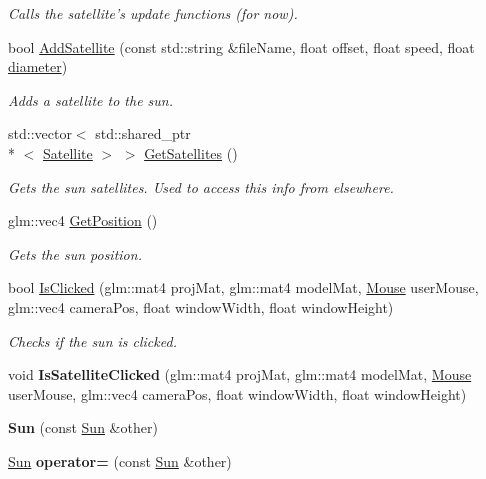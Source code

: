 \begin{DoxyCompactItemize}
\begin{DoxyCompactList}\small\item\em Calls the satellite's update functions (for now). \end{DoxyCompactList}\item 
bool \hyperlink{class_sun_aa83727a648f0456be4164fd6f2dc1e75}{Add\-Satellite} (const std\-::string \&file\-Name, float offset, float speed, float \hyperlink{class_sun_ac35fc9ebc427d9c8c9fd3ee3a12fce82}{diameter})
\begin{DoxyCompactList}\small\item\em Adds a satellite to the sun. \end{DoxyCompactList}\item 
\hypertarget{class_sun_a69fc54810b99f61d33be2dafafa3273d}{std\-::vector$<$ std\-::shared\-\_\-ptr\\*
$<$ \hyperlink{class_satellite}{Satellite} $>$ $>$ \hyperlink{class_sun_a69fc54810b99f61d33be2dafafa3273d}{Get\-Satellites} ()}\label{class_sun_a69fc54810b99f61d33be2dafafa3273d}

\begin{DoxyCompactList}\small\item\em Gets the sun satellites. Used to access this info from elsewhere. \end{DoxyCompactList}\item 
\hypertarget{class_sun_a8b531f7cf5b4b39ab1f5f453894f52bd}{glm\-::vec4 \hyperlink{class_sun_a8b531f7cf5b4b39ab1f5f453894f52bd}{Get\-Position} ()}\label{class_sun_a8b531f7cf5b4b39ab1f5f453894f52bd}

\begin{DoxyCompactList}\small\item\em Gets the sun position. \end{DoxyCompactList}\item 
bool \hyperlink{class_sun_a07ac47d10ff08b43c74de2b704d0ba5a}{Is\-Clicked} (glm\-::mat4 proj\-Mat, glm\-::mat4 model\-Mat, \hyperlink{class_mouse}{Mouse} user\-Mouse, glm\-::vec4 camera\-Pos, float window\-Width, float window\-Height)
\begin{DoxyCompactList}\small\item\em Checks if the sun is clicked. \end{DoxyCompactList}\item 
\hypertarget{class_sun_a5808caa1b90e6a743df2df5ecb9f9850}{void {\bfseries Is\-Satellite\-Clicked} (glm\-::mat4 proj\-Mat, glm\-::mat4 model\-Mat, \hyperlink{class_mouse}{Mouse} user\-Mouse, glm\-::vec4 camera\-Pos, float window\-Width, float window\-Height)}\label{class_sun_a5808caa1b90e6a743df2df5ecb9f9850}

\item 
\hypertarget{class_sun_a3f7d32a340ac92de0b49b1a804159431}{{\bfseries Sun} (const \hyperlink{class_sun}{Sun} \&other)}\label{class_sun_a3f7d32a340ac92de0b49b1a804159431}

\item 
\hypertarget{class_sun_a511e97ba6dbf11d67f2c7e611626e312}{\hyperlink{class_sun}{Sun} {\bfseries operator=} (const \hyperlink{class_sun}{Sun} \&other)}\label{class_sun_a511e97ba6dbf11d67f2c7e611626e312}

\end{DoxyCompactItemize}
